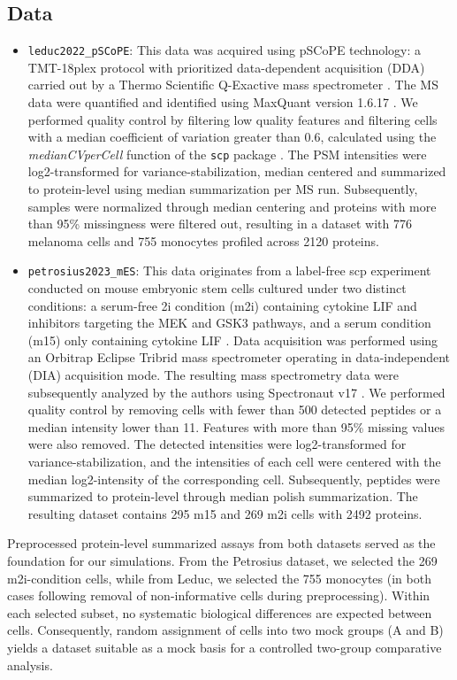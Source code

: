 \subsection{Data}
\begin{itemize}
    \item \texttt{leduc2022\_pSCoPE}: This data was acquired using pSCoPE technology: a TMT-18plex protocol with prioritized data-dependent acquisition (DDA) carried out by a Thermo Scientific Q-Exactive mass spectrometer \cite{leduc}. The MS data were quantified and identified using MaxQuant version 1.6.17 \cite{maxquant}. We performed quality control by filtering low quality features and filtering cells with a median coefficient of variation greater than 0.6, calculated using the \textit{medianCVperCell} function of the \texttt{scp} package \cite{scp_paper}. The PSM intensities were log2-transformed for variance-stabilization, median centered and summarized to protein-level using median summarization per MS run. Subsequently, samples were normalized through median centering and proteins with more than 95\% missingness were filtered out, resulting in a dataset with 776 melanoma cells and 755 monocytes profiled across 2120 proteins.
    \item \texttt{petrosius2023\_mES}: This data originates from a label-free scp experiment conducted on mouse embryonic stem cells cultured under two distinct conditions: a serum-free 2i condition (m2i) containing cytokine LIF and inhibitors targeting the MEK and GSK3 pathways, and a serum condition (m15) only containing cytokine LIF \cite{petro}. Data acquisition was performed using an Orbitrap Eclipse Tribrid mass spectrometer operating in data-independent (DIA) acquisition mode. The resulting mass spectrometry data were subsequently analyzed by the authors using Spectronaut v17 \cite{spectronaut}.
    We performed quality control by removing cells with fewer than 500 detected peptides or a median intensity lower than 11. Features with more than 95\% missing values were also removed. The detected intensities were log2-transformed for variance-stabilization, and the intensities of each cell were centered with the median log2-intensity of the corresponding cell. Subsequently, peptides were summarized to protein-level through median polish summarization. The resulting dataset contains 295 m15 and 269 m2i cells with 2492 proteins.
\end{itemize}
Preprocessed protein-level summarized assays from both datasets served as the foundation for our simulations. From the Petrosius dataset, we selected the 269 m2i-condition cells, while from Leduc, we selected the 755 monocytes (in both cases following removal of non-informative cells during preprocessing). Within each selected subset, no systematic biological differences are expected between cells. Consequently, random assignment of cells into two mock groups (A and B) yields a dataset suitable as a mock basis for a controlled two-group comparative analysis.

